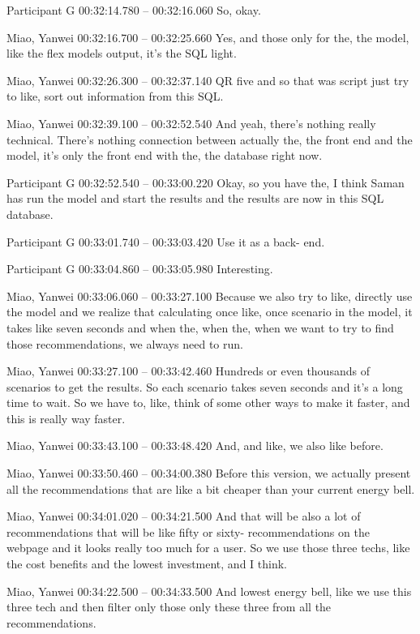 {Participant G 00:32:14.780 -- 00:32:16.060
So, okay.

Miao, Yanwei 00:32:16.700 -- 00:32:25.660
Yes, and those only for the, the model, like the flex models output, it's the SQL light.

Miao, Yanwei 00:32:26.300 -- 00:32:37.140
QR five and so that was script just try to like, sort out information from this SQL.

Miao, Yanwei 00:32:39.100 -- 00:32:52.540
And yeah, there's nothing really technical. There's nothing connection between actually the, the front end and the model, it's only the front end with the, the database right now.

Participant G 00:32:52.540 -- 00:33:00.220
Okay, so you have the, I think Saman has run the model and start the results and the results are now in this SQL database.

Participant G 00:33:01.740 -- 00:33:03.420
Use it as a back- end.

Participant G 00:33:04.860 -- 00:33:05.980
Interesting.

Miao, Yanwei 00:33:06.060 -- 00:33:27.100
Because we also try to like, directly use the model and we realize that calculating once like, once scenario in the model, it takes like seven seconds and when the, when the, when we want to try to find those recommendations, we always need to run.

Miao, Yanwei 00:33:27.100 -- 00:33:42.460
Hundreds or even thousands of scenarios to get the results. So each scenario takes seven seconds and it's a long time to wait. So we have to, like, think of some other ways to make it faster, and this is really way faster.

Miao, Yanwei 00:33:43.100 -- 00:33:48.420
And, and like, we also like before.

Miao, Yanwei 00:33:50.460 -- 00:34:00.380
Before this version, we actually present all the recommendations that are like a bit cheaper than your current energy bell.

Miao, Yanwei 00:34:01.020 -- 00:34:21.500
And that will be also a lot of recommendations that will be like fifty or sixty- recommendations on the webpage and it looks really too much for a user. So we use those three techs, like the cost benefits and the lowest investment, and I think.

Miao, Yanwei 00:34:22.500 -- 00:34:33.500
And lowest energy bell, like we use this three tech and then filter only those only these three from all the recommendations.

}

